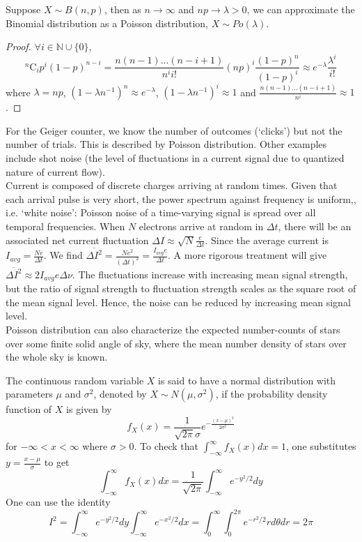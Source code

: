 \documentclass[a4paper]{article}
\begin{document}
\begin{thm}
Suppose $X\sim B(n,p)$, then  as $n\rightarrow\infty$ and $np\rightarrow\lambda>0$, we can approximate the Binomial distribution as a Poisson distribution, $X\sim Po(\lambda)$.
\end{thm}
\begin{proof}
$\forall i\in\mathbb{N}\cup\{0\}$,
$$^n\text{C}_ip^i(1-p)^{n-i}=\frac{n(n-1)...(n-i+1)}{n^i i!}(np)^i\frac{(1-p)^n}{(1-p)^i}\approx e^{-\lambda}\frac{\lambda^i}{i!}$$
where $\lambda=np$,  $(1-\lambda n^{-1})^n\approx e^{-\lambda}$, $(1-\lambda n^{-1})^i\approx 1$ and $\frac{n(n-1)...(n-i+1)}{n^i}\approx1$.
\end{proof}
\begin{Note}
For the Geiger counter, we know the number of outcomes (`clicks') but not the number of trials. This is described by Poisson distribution. Other examples include shot noise (the level of fluctuations in a current signal due to quantized nature of current flow).\\[5pt]
Current is composed of discrete charges arriving at random times. Given that each arrival pulse is very short, the power spectrum against frequency is uniform,, i.e. `white noise': Poisson noise of a time-varying signal is spread over all temporal frequencies. When $N$ electrons arrive at random in $\Delta t$, there will be an associated net current fluctuation $\Delta I\approx\sqrt{N}\frac{e}{\Delta t}$. Since the average current is $I_{avg}=\frac{Ne}{\Delta t}$. We find $\overline{\Delta I^2}=\frac{Ne^2}{(\Delta t)^2}=\frac{I_{avg}e}{\Delta t}$. A more rigorous treatment will give $\overline{\Delta I^2}\approx 2I_{avg}e\Delta \nu$. The fluctuations increase with increasing mean signal strength, but the ratio of signal strength to fluctuation strength scales as the square root of the mean signal level. Hence, the noise can be reduced by increasing mean signal level. \\[5pt]
Poisson distribution can also characterize the expected number-counts of stars over some finite solid angle of sky, where the mean number density of stars over the whole sky is known.
\end{Note}
\begin{defi}
The continuous random variable $X$ is said to have a normal distribution with parameters $\mu$ and $\sigma^2$, denoted by $X\sim N(\mu,\sigma^2)$, if the probability density function of $X$ is given by
$$f_X(x)=\frac{1}{\sqrt{2\pi}\sigma}e^{-\frac{(x-\mu)^2}{2\sigma^2}}$$
for $-\infty<x<\infty$ where $\sigma>0$.
To check that $\int_{-\infty}^\infty f_X(x)dx=1$, one substitutes $y=\frac{x-\mu}{\sigma}$ to get $$\int_{-\infty}^\infty f_X(x)dx=\frac{1}{\sqrt{2\pi}}\int_{-\infty}^\infty e^{-y^2/2}dy$$
One can use the identity
$$I^2=\int_{-\infty}^\infty e^{-y^2/2}dy\int_{-\infty}^\infty e^{-x^2/2}dx=\int_0^\infty\int_0^{2\pi}e^{-r^2/2}rd\theta dr=2\pi$$
\end{defi}
\end{document}
